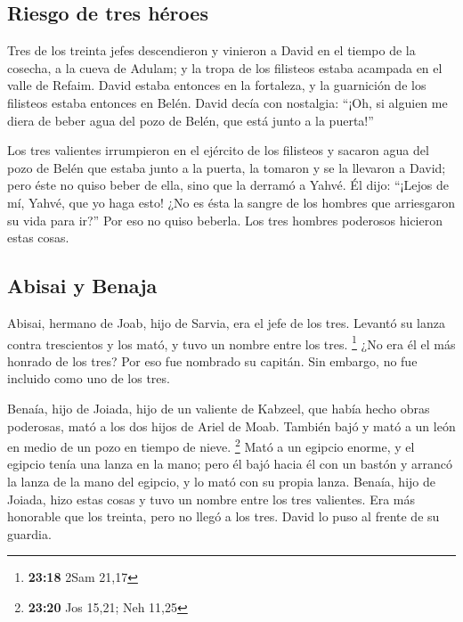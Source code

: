 \hypertarget{riesgo-de-tres-huxe9roes}{%
\subsection{Riesgo de tres héroes}\label{riesgo-de-tres-huxe9roes}}

 Tres de los treinta jefes descendieron y vinieron a
David en el tiempo de la cosecha, a la cueva de Adulam; y la tropa de
los filisteos estaba acampada en el valle de Refaim. 
David estaba entonces en la fortaleza, y la guarnición de los filisteos
estaba entonces en Belén.  David decía con nostalgia:
``¡Oh, si alguien me diera de beber agua del pozo de Belén, que está
junto a la puerta!''

 Los tres valientes irrumpieron en el ejército de los
filisteos y sacaron agua del pozo de Belén que estaba junto a la puerta,
la tomaron y se la llevaron a David; pero éste no quiso beber de ella,
sino que la derramó a Yahvé.  Él dijo: ``¡Lejos de mí,
Yahvé, que yo haga esto! ¿No es ésta la sangre de los hombres que
arriesgaron su vida para ir?'' Por eso no quiso beberla. Los tres
hombres poderosos hicieron estas cosas.

\hypertarget{abisai-y-benaja}{%
\subsection{Abisai y Benaja}\label{abisai-y-benaja}}

 Abisai, hermano de Joab, hijo de Sarvia, era el jefe de
los tres. Levantó su lanza contra trescientos y los mató, y tuvo un
nombre entre los tres. \footnote{\textbf{23:18} 2Sam 21,17}
 ¿No era él el más honrado de los tres? Por eso fue
nombrado su capitán. Sin embargo, no fue incluido como uno de los tres.

 Benaía, hijo de Joiada, hijo de un valiente de Kabzeel,
que había hecho obras poderosas, mató a los dos hijos de Ariel de Moab.
También bajó y mató a un león en medio de un pozo en tiempo de nieve.
\footnote{\textbf{23:20} Jos 15,21; Neh 11,25}  Mató a un
egipcio enorme, y el egipcio tenía una lanza en la mano; pero él bajó
hacia él con un bastón y arrancó la lanza de la mano del egipcio, y lo
mató con su propia lanza.  Benaía, hijo de Joiada, hizo
estas cosas y tuvo un nombre entre los tres valientes. 
Era más honorable que los treinta, pero no llegó a los tres. David lo
puso al frente de su guardia.

